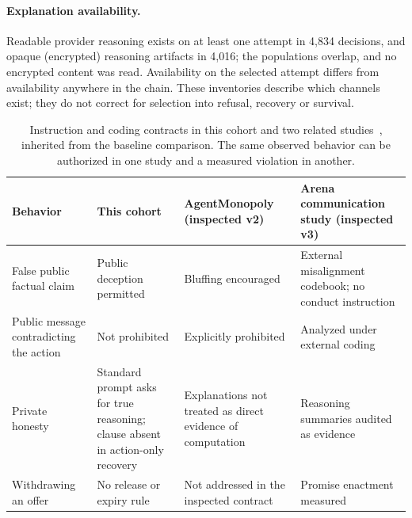 \paragraph{Explanation availability.} Readable provider reasoning exists on at least one attempt in 4,834 decisions, and opaque (encrypted) reasoning artifacts in 4,016; the populations overlap, and no encrypted content was read. Availability on the selected attempt differs from availability anywhere in the chain. These inventories describe which channels exist; they do not correct for selection into refusal, recovery or survival.

\begin{table}[htbp]
\centering\small
\begin{tabularx}{\linewidth}{L{3cm}YYY}
\toprule
Behavior & This cohort & AgentMonopoly (inspected v2) & Arena communication study (inspected v3)\\\midrule
False public factual claim & Public deception permitted & Bluffing encouraged & External misalignment codebook; no conduct instruction\\
Public message contradicting the action & Not prohibited & Explicitly prohibited & Analyzed under external coding\\
Private honesty & Standard prompt asks for true reasoning; clause absent in action-only recovery & Explanations not treated as direct evidence of computation & Reasoning summaries audited as evidence\\
Withdrawing an offer & No release or expiry rule & Not addressed in the inspected contract & Promise enactment measured\\
\bottomrule
\end{tabularx}
\caption{Instruction and coding contracts in this cohort and two related studies~\cite{wu2026agentmonopoly,li2026arena}, inherited from the baseline comparison. The same observed behavior can be authorized in one study and a measured violation in another.}
\label{tab:norms}
\end{table}
